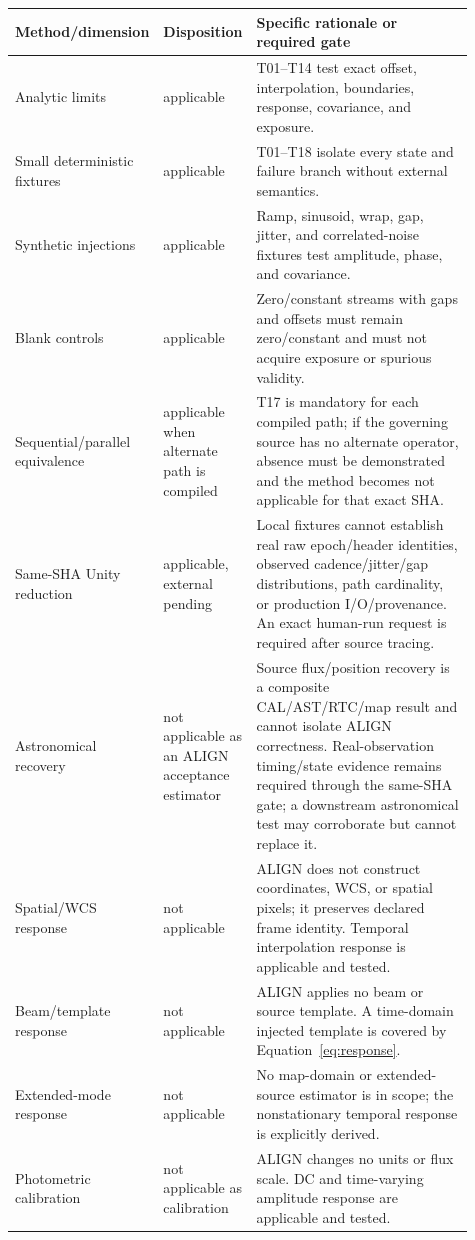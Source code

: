 \documentclass[11pt]{article}
\begin{document}
\begin{longtable}{L{0.22\linewidth}L{0.16\linewidth}L{0.53\linewidth}}
\toprule
Method/dimension & Disposition & Specific rationale or required gate\\
\midrule
Analytic limits & applicable & T01--T14 test exact offset, interpolation, boundaries, response, covariance, and exposure.\\
Small deterministic fixtures & applicable & T01--T18 isolate every state and failure branch without external semantics.\\
Synthetic injections & applicable & Ramp, sinusoid, wrap, gap, jitter, and correlated-noise fixtures test amplitude, phase, and covariance.\\
Blank controls & applicable & Zero/constant streams with gaps and offsets must remain zero/constant and must not acquire exposure or spurious validity.\\
Sequential/parallel equivalence & applicable when alternate path is compiled & T17 is mandatory for each compiled path; if the governing source has no alternate operator, absence must be demonstrated and the method becomes not applicable for that exact SHA.\\
Same-SHA Unity reduction & applicable, external pending & Local fixtures cannot establish real raw epoch/header identities, observed cadence/jitter/gap distributions, path cardinality, or production I/O/provenance.  An exact human-run request is required after source tracing.\\
Astronomical recovery & not applicable as an ALIGN acceptance estimator & Source flux/position recovery is a composite CAL/AST/RTC/map result and cannot isolate ALIGN correctness.  Real-observation timing/state evidence remains required through the same-SHA gate; a downstream astronomical test may corroborate but cannot replace it.\\
Spatial/WCS response & not applicable & ALIGN does not construct coordinates, WCS, or spatial pixels; it preserves declared frame identity.  Temporal interpolation response is applicable and tested.\\
Beam/template response & not applicable & ALIGN applies no beam or source template.  A time-domain injected template is covered by Equation~\eqref{eq:response}.\\
Extended-mode response & not applicable & No map-domain or extended-source estimator is in scope; the nonstationary temporal response is explicitly derived.\\
Photometric calibration & not applicable as calibration & ALIGN changes no units or flux scale.  DC and time-varying amplitude response are applicable and tested.\\

\end{longtable}
\end{document}
